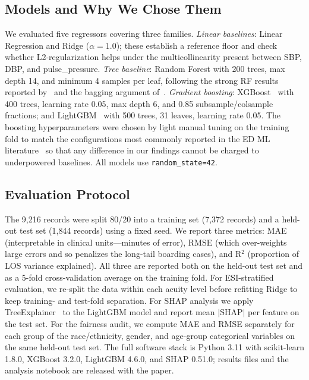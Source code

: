 \documentclass[conference]{IEEEtran}
\begin{document}
\subsection{Models and Why We Chose Them}
We evaluated five regressors covering three families.
\textit{Linear baselines}: Linear Regression and Ridge ($\alpha=1.0$); these
establish a reference floor and check whether L2-regularization helps
under the multicollinearity present between SBP, DBP, and pulse\_pressure.
\textit{Tree baseline}: Random Forest with 200 trees, max depth 14, and
minimum 4 samples per leaf, following the strong RF results reported
by~\cite{ricciardi2024} and the bagging argument of~\cite{breiman2001}.
\textit{Gradient boosting}: XGBoost~\cite{chen2016xgboost} with 400 trees,
learning rate 0.05, max depth 6, and 0.85 subsample/colsample fractions; and
LightGBM~\cite{ke2017lightgbm} with 500 trees, 31 leaves, learning rate
0.05. The boosting hyperparameters were chosen by light manual tuning on
the training fold to match the configurations most commonly reported in the
ED ML literature~\cite{wu2025, seo2024, wang2025fair} so that any difference
in our findings cannot be charged to underpowered baselines. All models use
\texttt{random\_state=42}.

\subsection{Evaluation Protocol}
The 9{,}216 records were split 80/20 into a training set (7{,}372 records)
and a held-out test set (1{,}844 records) using a fixed seed. We report
three metrics: MAE (interpretable in clinical units---minutes of error),
RMSE (which over-weights large errors and so penalizes the long-tail
boarding cases), and R$^2$ (proportion of LOS variance explained). All three
are reported both on the held-out test set and as a 5-fold cross-validation
average on the training fold. For ESI-stratified evaluation, we re-split the
data within each acuity level before refitting Ridge to keep training- and
test-fold separation. For SHAP analysis we apply
TreeExplainer~\cite{shap, lundberg2018} to the LightGBM model and report
mean $|$SHAP$|$ per feature on the test set. For the fairness audit, we
compute MAE and RMSE separately for each group of the
race/ethnicity, gender, and age-group categorical variables on the same
held-out test set. The full software stack is Python 3.11 with
scikit-learn 1.8.0, XGBoost 3.2.0, LightGBM 4.6.0, and SHAP 0.51.0; results
files and the analysis notebook are released with the paper.
\end{document}
